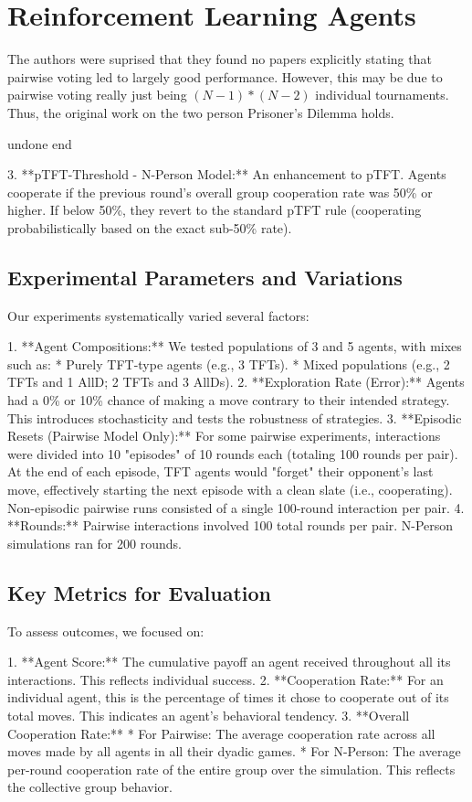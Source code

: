 \documentclass[]{llncs} %
\begin{document}
\section {Reinforcement Learning Agents}

The authors were suprised that they found no papers explicitly stating
that pairwise voting led to largely good performance.  However, this
may be due to pairwise voting really just being  $(N-1)*(N-2)$ individual
tournaments.  Thus, the original work on the two person Prisoner's Dilemma
holds.

undone end

3.  **pTFT-Threshold - N-Person Model:** An enhancement to pTFT. Agents cooperate if the previous round's overall group cooperation rate was 50\% or higher. If below 50\%, they revert to the standard pTFT rule (cooperating probabilistically based on the exact sub-50\% rate).

\subsection{Experimental Parameters and Variations}
Our experiments systematically varied several factors:

1.  **Agent Compositions:** We tested populations of 3 and 5 agents, with mixes such as:
    *   Purely TFT-type agents (e.g., 3 TFTs).
    *   Mixed populations (e.g., 2 TFTs and 1 AllD; 2 TFTs and 3 AllDs).
2.  **Exploration Rate (Error):** Agents had a 0\% or 10\% chance of making a move contrary to their intended strategy. This introduces stochasticity and tests the robustness of strategies.
3.  **Episodic Resets (Pairwise Model Only):** For some pairwise experiments, interactions were divided into 10 "episodes" of 10 rounds each (totaling 100 rounds per pair). At the end of each episode, TFT agents would "forget" their opponent's last move, effectively starting the next episode with a clean slate (i.e., cooperating). Non-episodic pairwise runs consisted of a single 100-round interaction per pair.
4.  **Rounds:** Pairwise interactions involved 100 total rounds per pair. N-Person simulations ran for 200 rounds.

\subsection{Key Metrics for Evaluation}
To assess outcomes, we focused on:

1.  **Agent Score:** The cumulative payoff an agent received throughout all its interactions. This reflects individual success.
2.  **Cooperation Rate:** For an individual agent, this is the percentage of times it chose to cooperate out of its total moves. This indicates an agent's behavioral tendency.
3.  **Overall Cooperation Rate:**
    *   For Pairwise: The average cooperation rate across all moves made by all agents in all their dyadic games.
    *   For N-Person: The average per-round cooperation rate of the entire group over the simulation. This reflects the collective group behavior.
\end{document}
